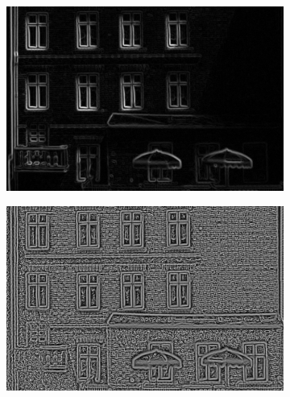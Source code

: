\documentclass[thesis.tex]{subfiles}
\begin{document}
\begin{figure}[tb]
\begin{subfigure}[t]{0.49\textwidth}
        \caption{}
        \label{fig:pixelNormalizationExample3}
    \end{subfigure}
    \begin{subfigure}[t]{0.49\textwidth}
        \includegraphics[width=\textwidth]{img/pixelNormalizationExample4.png}
        \caption{}
        \label{fig:pixelNormalizationExample4}
    \end{subfigure}
    \begin{subfigure}[t]{0.49\textwidth}
        \includegraphics[width=\textwidth]{img/pixelNormalizationExample5.png}
        \caption{}
        \label{fig:pixelNormalizationExample5}
    \end{subfigure}
    \begin{subfigure}[t]{0.49\textwidth}

\end{subfigure}
\end{figure}
\end{document}
